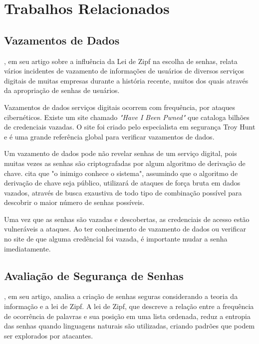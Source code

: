 \documentclass[12pt]{article}
\begin{document}
\section{Trabalhos Relacionados}

\subsection{Vazamentos de Dados}

\cite{article:1}, em seu artigo sobre a influência da Lei de Zipf na
escolha de senhas, relata vários incidentes de vazamento de informações de
usuários de diversos serviços digitais de muitas empresas durante a história
recente, muitos dos quais através da apropriação de senhas de usuários.

Vazamentos de dados serviços digitais ocorrem com frequência, por ataques
cibernéticos.
Existe um site chamado \textit{"Have I Been Pwned"} \cite{hibp} que cataloga bilhões de
credenciais vazadas.
O site foi criado pelo especialista em segurança Troy Hunt e é uma grande
referência global para verificar vazamentos de dados.

Um vazamento de dados pode não revelar senhas de um serviço digital, pois muitas
vezes as senhas são criptografadas por algum algoritmo de derivação de chave.
\cite{article:1} cita que "o inimigo conhece o sistema", assumindo que o algoritmo
de derivação de chave seja público, utilizará de ataques de força bruta em dados
vazados, através de busca exaustiva de todo tipo de combinação possível para
descobrir o maior número de senhas possíveis.

Uma vez que as senhas são vazadas e descobertas, as credenciais de acesso estão
vulneráveis a ataques.
Ao ter conhecimento de vazamento de dados ou verificar no site de \cite{hibp} que
alguma credêncial foi vazada, é importante mudar a senha imediatamente.

\subsection{Avaliação de Segurança de Senhas}

\cite{article:1}, em seu artigo, analisa a criação de senhas seguras considerando
a teoria da informação e a lei de Zipf.
A lei de Zipf, que descreve a relação entre a frequência de ocorrência de
palavras e sua posição em uma lista ordenada, reduz a entropia das senhas
quando linguagens naturais são utilizadas, criando padrões que podem ser
explorados por atacantes.
\end{document}
